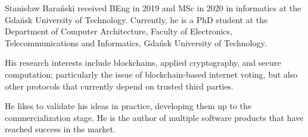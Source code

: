 \documentclass[preprint,3p]{elsarticle}
\begin{document}
{Stanis\l{}aw Bara{\'n}ski} received BEng in 2019 and MSc in 2020 in informatics at the Gdańsk University of Technology. 
Currently, he is a PhD student at the Department of Computer Architecture, Faculty of Electronics, Telecommunications and Informatics, Gdańsk University of Technology.

His research interests include blockchains, applied cryptography, and secure computation; particularly the issue of blockchain-based internet voting, but also other protocols that currently depend on trusted third parties.

He likes to validate his ideas in practice, developing them up to the commercialization stage. He is the author of multiple software products that have reached success in the market.
\end{document}
